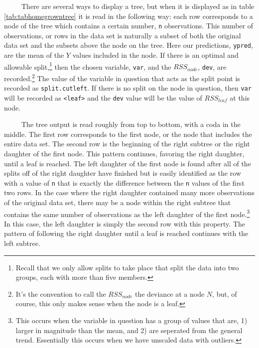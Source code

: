 \documentclass[12pt,twoside]{reedthesis}
\begin{document}
  ~~~~~There are several ways to display a tree, but when it is displayed
  as in table \ref{tab:tabhomegrowntree} it is read in the following way:
  each row corresponds to a node of the tree which contains a certain
  number, \texttt{n} observations. This number of observations, or rows in
  the data set is naturally a subset of both the original data set and the
  subsets above the node on the tree. Here our predictions,
  \texttt{ypred}, are the mean of the \(Y\) values included in the node.
  If there is an optimal and allowable split,\footnote{Recall that we only
    allow splits to take place that split the data into two groups, each
    with more than five members.} then the chosen variable, \texttt{var},
  and the \(RSS_{node}\), \texttt{dev}, are recorded.\footnote{It's the
    convention to call the \(RSS_{node}\) the deviance at a node \(N\),
    but, of course, this only makes sense when the node is a leaf.} The
  value of the variable in question that acts as the split point is
  recorded as \texttt{split.cutleft}. If there is no split on the node in
  question, then \texttt{var} will be recorded as
  \texttt{\textless{}leaf\textgreater{}} and the \texttt{dev} value will
  be the value of \(RSS_{leaf}\) at this node.
  
  ~~~~~The tree output is read roughly from top to bottom, with a coda in
  the middle. The first row corresponds to the first node, or the node
  that includes the entire data set. The second row is the beginning of
  the right subtree or the right daughter of the first node. This pattern
  continues, favoring the right daughter, until a leaf is reached. The
  left daughter of the first node is found after all of the splits off of
  the right daughter have finished but is easily identified as the row
  with a value of \texttt{n} that is exactly the difference between the
  \texttt{n} values of the first two rows. In the case where the right
  daughter contained many more observations of the original data set,
  there may be a node within the right subtree that contains the same
  number of observations as the left daughter of the first node.\footnote{This
    occurs when the variable in question has a group of values that are,
    1) larger in magnitude than the mean, and 2) are seperated from the
    general trend. Essentially this occurs when we have unscaled data with
    outliers.} In this case, the left daughter is simply the second row
  with this property. The pattern of following the right daughter until a
  leaf is reached continues with the left subtree.
  
\end{document}
